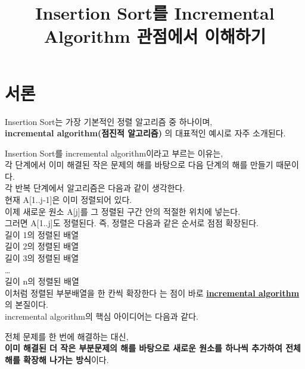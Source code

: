 \documentclass[
  korean,
]{article}
\title{Insertion Sort를 Incremental Algorithm 관점에서 이해하기}
\author{}
\date{}
\begin{document}
\maketitle


\section{서론}\label{uxc11cuxb860}

Insertion Sort는 가장 기본적인 정렬 알고리즘 중 하나이며,\\
\textbf{incremental algorithm(점진적 알고리즘)} 의 대표적인 예시로 자주
소개된다.

Insertion Sort를 incremental algorithm이라고 부르는 이유는,\\
각 단계에서 이미 해결된 작은 문제의 해를 바탕으로 다음 단계의 해를
만들기 때문이다.\\

각 반복 단계에서 알고리즘은 다음과 같이 생각한다.\\

현재 A{[}1..j-1{]}은 이미 정렬되어 있다.\\
이제 새로운 원소 A{[}j{]}를 그 정렬된 구간 안의 적절한 위치에 넣는다.\\
그러면 A{[}1..j{]}도 정렬된다. 즉, 정렬은 다음과 같은 순서로 점점
확장된다.\\

길이 1의 정렬된 배열\\
길이 2의 정렬된 배열\\
길이 3의 정렬된 배열\\
\ldots{}\\
길이 n의 정렬된 배열\\

이처럼 정렬된 부분배열을 한 칸씩 확장한다 는 점이 바로
\ul{\textbf{incremental algorithm}}의 본질이다.\\

incremental algorithm의 핵심 아이디어는 다음과 같다.

\begin{tcolorbox}[enhanced jigsaw, arc=.35mm, bottomrule=.15mm, bottomtitle=1mm, breakable, colback=white, colbacktitle=quarto-callout-note-color!10!white, colframe=quarto-callout-note-color-frame, coltitle=black, left=2mm, leftrule=.75mm, opacityback=0, opacitybacktitle=0.6, rightrule=.15mm, title=\textcolor{quarto-callout-note-color}{\faInfo}\hspace{0.5em}{Incremental Algorithm의 핵심 아이디어}, titlerule=0mm, toprule=.15mm, toptitle=1mm]

전체 문제를 한 번에 해결하는 대신,\\
\textbf{이미 해결된 더 작은 부분문제의 해를 바탕으로 새로운 원소를
하나씩 추가하여 전체 해를 확장해 나가는 방식}이다.

\end{tcolorbox}
\end{document}
